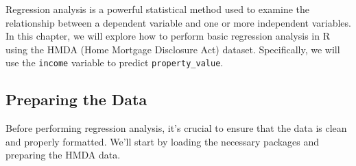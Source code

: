 \documentclass[
]{book}
\begin{document}
Regression analysis is a powerful statistical method used to examine the relationship between a dependent variable and one or more independent variables. In this chapter, we will explore how to perform basic regression analysis in R using the HMDA (Home Mortgage Disclosure Act) dataset. Specifically, we will use the \texttt{income} variable to predict \texttt{property\_value}.

\hypertarget{preparing-the-data}{%
\subsection{Preparing the Data}\label{preparing-the-data}}

Before performing regression analysis, it's crucial to ensure that the data is clean and properly formatted. We'll start by loading the necessary packages and preparing the HMDA data.
\end{document}
